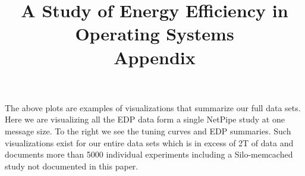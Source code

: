 \documentclass[pageno]{jpaper}
\begin{document}
\title{A Study of Energy Efficiency in Operating Systems \\ \textbf{Appendix}}

\date{}




The above plots are examples of visualizations that summarize our full data sets.  Here we are visualizing all the EDP data form a single NetPipe study at one message size.  To the right we see the tuning curves and EDP summaries.  Such visualizations exist for our entire data sets which is in excess of 2T of data and documents more than 5000 individual experiments including a Silo-memcached study not documented in this paper.
\end{document}
